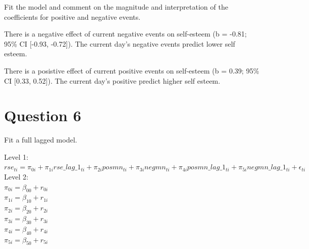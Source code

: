 \documentclass[]{article}
\begin{document}
Fit the model and comment on the magnitude and interpretation of the
coefficients for positive and negative events.

There is a negative effect of current negative events on self-esteem (b
= -0.81; 95\% CI {[}-0.93, -0.72{]}). The current day's negative events
predict lower self esteem.

There is a posistive effect of current positive events on self-esteem (b
= 0.39; 95\% CI {[}0.33, 0.52{]}). The current day's positive predict
higher self esteem.

\section{Question 6}\label{question-6}

Fit a full lagged model.

Level 1:\\
\(rse_{ti} = \pi_{0i} + \pi_{1i}rse\_lag\_1_{ti} + \pi_{2i}posmn_{ti} + \pi_{3i}negmn_{ti} + \pi_{4i}posmn\_lag\_1_{ti} + \pi_{5i}negmn\_lag\_1_{ti} + \epsilon_{ti}\)\\
Level 2:\\
\(\pi_{0i} = \beta_{00} + r_{0i}\)\\
\(\pi_{1i} = \beta_{10} + r_{1i}\)\\
\(\pi_{2i} = \beta_{20} + r_{2i}\)\\
\(\pi_{3i} = \beta_{30} + r_{3i}\)\\
\(\pi_{4i} = \beta_{40} + r_{4i}\)\\
\(\pi_{5i} = \beta_{50} + r_{5i}\)
\end{document}
